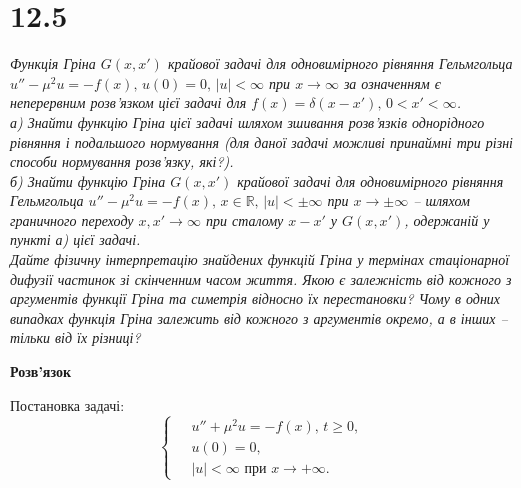 %
%

%


\section[Задача №12.5]{12.5}

\textit{Функція Гріна $G(x,x')$ крайової задачі для одновимірного рівняння Гельмгольца $u'' - \mu^2u = -f(x), \, u(0) = 0, \, |u| < \infty $ при $x \to \infty$ за означенням є неперервним розв’язком цієї задачі для $f(x) = \delta(x-x'), \, 0 < x' < \infty$.\\
а) Знайти функцію Гріна цієї задачі шляхом зшивання розв’язків однорідного рівняння і подальшого нормування (для даної задачі можливі принаймні три різні способи нормування розв’язку, які?).\\
б) Знайти функцію Гріна $G(x,x')$ крайової задачі для одновимірного рівняння Гельмгольца $u'' - \mu^2u = -f(x), \, x \in \mathbb{R}, \, |u| < \pm\infty $ при $x \to \pm\infty$ – шляхом граничного переходу $x, x' \to \infty$ при сталому $x-x'$ у $G(x,x')$, одержаній у пункті а) цієї задачі.\\
Дайте фізичну інтерпретацію знайдених функцій Гріна у термінах стаціонарної дифузії частинок зі скінченним часом життя. Якою є залежність від кожного з аргументів функції Гріна та симетрія відносно їх перестановки? Чому в одних випадках функція Гріна залежить від кожного з аргументів окремо, а в інших – тільки від їх різниці?}

\begin{center}
    \large{\textbf{Розв'язок}}
\end{center}

Постановка задачі:
\begin{equation} \label{cond12,5}
    \left\{ \begin{aligned}
        \;&u'' + \mu^2u = -f(x),\, t \geq 0,\\
          &u(0) = 0,\\
          & |u| < \infty \text{ при } x \to +\infty.
    \end{aligned} \right.
\end{equation}


